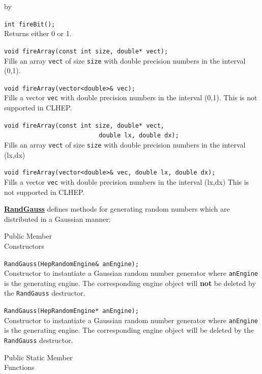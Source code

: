 \documentclass[twoside]{article}
\newcommand{\comp}[1]{\texttt{#1}}%
\newcommand{\entrylabel}[1]{\mbox{\textbf{{#1}}}\hfil}%
\newenvironment{entry}
{\begin{list}{}%
    {\renewcommand{\makelabel}{\entrylabel}%
     \setlength{\labelwidth}{90pt}%
     \setlength{\leftmargin}{\labelwidth}
     \advance\leftmargin by \labelsep%
      }%
    }%
  {\end{list}}
\newcommand{\Entrylabel}[1]%
{\raisebox{0pt}[1ex][0pt]{\makebox[\labelwidth][l]%
    {\parbox[t]{\labelwidth}{\hspace{0pt}\textbf{{#1}}}}}}
\newenvironment{Entry}%
{\renewcommand{\entrylabel}{\Entrylabel}\begin{entry}}%
  {\end{entry}}
\begin{document}
\begin{Entry}
   \verb+int fireBit();+\\
   Returns either 0 or 1.
  
   \verb+void fireArray(const int size, double* vect);+\\
   Fills an array \comp{vect} of size \comp{size} with double
   precision numbers in the interval (0,1).

   \verb+void fireArray(vector<double>& vec);+\\
   Fills a vector \comp{vec} with double
   precision numbers in the interval (0,1).
   This is not supported in CLHEP.
   
   \verb+void fireArray(const int size, double* vect,+\\
   \verb+                          double lx, double dx);+\\
   Fills an array \comp{vect} of size \comp{size} with double
   precision numbers in the interval (lx,dx)

   \verb+void fireArray(vector<double>& vec, double lx, double dx);+\\
   Fills a vector \comp{vec} with double
   precision numbers in the interval (lx,dx)
   This is not supported in CLHEP.
   
   \begin{description}
     \item \underline{\bf RandGauss}  defines methods for generating random
      numbers which are distributed in a Gaussian manner:
   \end{description}
   
\item[Public Member\\ Constructors]

   \verb+RandGauss(HepRandomEngine& anEngine);+\\
   Constructor to instantiate a Gaussian random number generator
   where \comp{anEngine} is the generating engine.  The corresponding
   engine object will {\bf not} be deleted by the \comp{RandGauss} destructor.
   
   \verb+RandGauss(HepRandomEngine* anEngine);+\\
   Constructor to instantiate a Gaussian random number generator
   where \comp{anEngine} is the generating engine.  The corresponding
   engine object will be deleted by the \comp{RandGauss} destructor.
  
\item[Public Static Member\\ Functions]
  

\end{Entry}
\end{document}
